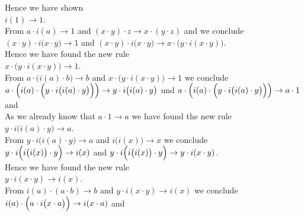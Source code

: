 Hence we have shown
\\[0.2cm]
\hspace*{1.3cm}
$i(1) \rightarrow 1$.
\\[0.2cm]
From $a \cdot i(a) \rightarrow 1$ and $(x \cdot y) \cdot z \rightarrow x \cdot (y \cdot z)$ and we conclude
\\[0.2cm]
\hspace*{1.3cm}
$(x \cdot y) \cdot i\bigl(x \cdot y) \rightarrow 1$ \quad and \quad
$(x \cdot y) \cdot i\bigl(x \cdot y) \rightarrow x \cdot \bigl(y \cdot i(x \cdot y)\bigr)$.
\\[0.2cm]
Hence we have found the new rule
\\[0.2cm]
\hspace*{1.3cm}
$x \cdot \bigl(y \cdot i(x \cdot y)\bigr) \rightarrow 1$.
\\[0.2cm]
From $a \cdot \bigl(i(a) \cdot b\bigr) \rightarrow b$ and
$x \cdot \bigl(y \cdot i(x \cdot y)\bigr) \rightarrow 1$ we conclude
\\[0.2cm]
\hspace*{1.3cm}
$a \cdot \Bigl(i(a) \cdot \Bigl(y \cdot i\bigl(i(a)\cdot y\bigr)\Bigr)\Bigr) \rightarrow y \cdot i\bigl(i(a)\cdot y\bigr)$
\quad und \quad
$a \cdot \Bigl(i(a) \cdot \Bigl(y \cdot i\bigl(i(a)\cdot y\bigr)\Bigr)\Bigr) \rightarrow a \cdot 1$
\quad and \quad
\\[0.2cm]
As we already know that $a \cdot 1 \rightarrow a$ we have found the new rule
\\[0.2cm]
\hspace*{1.3cm}
$y \cdot i\bigl(i(a)\cdot y\bigr) \rightarrow a$.
\\[0.2cm]
From $y \cdot i\bigl(i(a)\cdot y\bigr) \rightarrow a$ and $i\bigl(i(x)\bigr) \rightarrow x$ we conclude
\\[0.2cm]
\hspace*{1.3cm}
$y \cdot i\Bigl(i\bigl(i(x)\bigr)\cdot y\Bigr) \rightarrow i(x)$ \quad and \quad
$y \cdot i\Bigl(i\bigl(i(x)\bigr)\cdot y\Bigr) \rightarrow y \cdot i(x \cdot y)$.
\\[0.2cm]
Hence we have found the new rule
\\[0.2cm]
\hspace*{1.3cm}
$y \cdot i(x \cdot y) \rightarrow i(x)$.
\\[0.2cm]
From $i(a) \cdot (a \cdot b) \rightarrow b$ and $y \cdot i(x \cdot y) \rightarrow i(x)$ we conclude
\\[0.2cm]
\hspace*{1.3cm}
$i(a) \cdot \Bigl(a \cdot i\bigl(x \cdot a\bigr)\Bigr) \rightarrow i(x \cdot a)$ \quad and \quad
